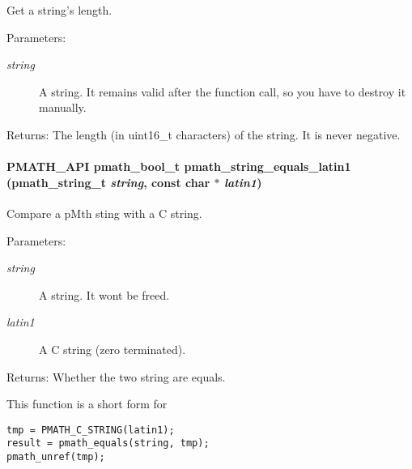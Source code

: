 Get a string's length. 

\begin{Desc}
\item[Parameters:]
\begin{description}
\item[{\em string}]A string. It remains valid after the function call, so you have to destroy it manually. \end{description}
\end{Desc}
\begin{Desc}
\item[Returns:]The length (in uint16\_\-t characters) of the string. It is never negative. \end{Desc}
\hypertarget{group__strings_g710d7a70319d6fa805ddd7ed0ea65365}{
\paragraph[{pmath\_\-string\_\-equals\_\-latin1}]{\setlength{\rightskip}{0pt plus 5cm}PMATH\_\-API {\bf pmath\_\-bool\_\-t} pmath\_\-string\_\-equals\_\-latin1 ({\bf pmath\_\-string\_\-t} {\em string}, \/  const char $\ast$ {\em latin1})}\hfill}
\label{group__strings_g710d7a70319d6fa805ddd7ed0ea65365}


Compare a pMth sting with a C string. 

\begin{Desc}
\item[Parameters:]
\begin{description}
\item[{\em string}]A string. It wont be freed. \item[{\em latin1}]A C string (zero terminated). \end{description}
\end{Desc}
\begin{Desc}
\item[Returns:]Whether the two string are equals.\end{Desc}
This function is a short form for 

\begin{Code}\begin{verbatim}tmp = PMATH_C_STRING(latin1);
result = pmath_equals(string, tmp);
pmath_unref(tmp);
\end{verbatim}
\end{Code}

 